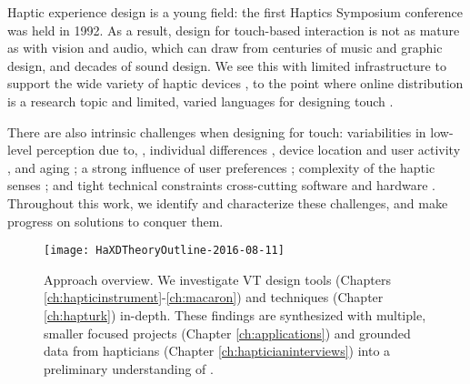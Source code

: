 Haptic experience design is a young field:
the first Haptics Symposium conference was held in 1992.
As a result, design for touch-based interaction is not as mature as with vision and audio, which can draw from centuries of music and graphic design, and decades of sound design.
We see this with limited infrastructure to support the wide variety of haptic devices \cite{Hayward2007}, to the point where online distribution is a research topic \cite{AbdurRahman2010} and limited, varied languages for designing touch \cite{Jansson-Boyd2011}.

There are also intrinsic challenges when designing for touch:
variabilities in low-level perception due to, \eg, individual differences \cite{Lo1984}, device location and user activity \cite{Karuei2011}, and aging \cite{Stevens1996,Stevens1992};
a strong influence of user preferences \cite{Seifi2014,Seifi2015};
complexity of the haptic senses \cite{ChoiKuchenbecker2013,Lederman2009survey,Kandel2000};
and tight technical constraints cross-cutting software and hardware \cite{levitin2000perception,Hayward2007}.
Throughout this work, we identify and characterize these challenges, and make progress on solutions to conquer them.



\begin{figure}[htbp]
\begin{center}
\texttt{[image: HaXDTheoryOutline-2016-08-11]}
\caption{Approach overview. We investigate VT design tools (Chapters \ref{ch:hapticinstrument}-\ref{ch:macaron}) and techniques (Chapter \ref{ch:hapturk}) in-depth. These findings are synthesized with multiple, smaller focused projects (Chapter \ref{ch:applications}) and grounded data from hapticians (Chapter \ref{ch:hapticianinterviews}) into a preliminary understanding of \haxd.}
\label{fig:intro:methodologyoverview}
\end{center}
\end{figure}



